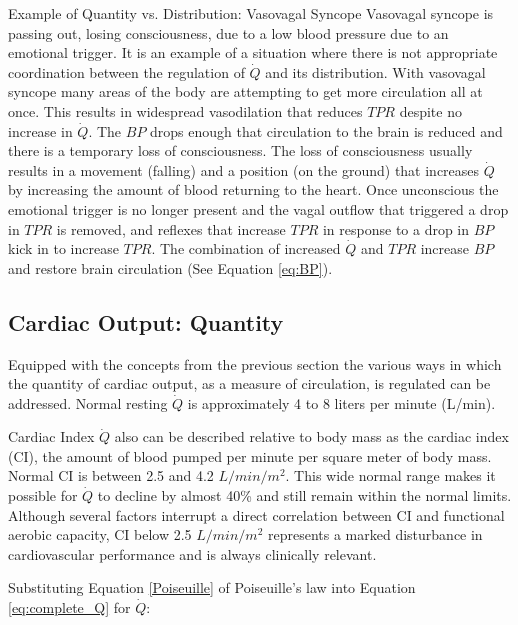 \begin{warning}{Example of Quantity vs. Distribution: Vasovagal Syncope}
   Vasovagal syncope is passing out, losing consciousness, due to a low blood pressure due to an emotional trigger. It is an example of a situation where there is not appropriate coordination between the regulation of $\dot{Q}$ and its distribution. With vasovagal syncope many areas of the body are attempting to get more circulation all at once. This results in widespread vasodilation that reduces $TPR$ despite no increase in $\dot{Q}$. The $BP$ drops enough that circulation to the brain is reduced and there is a temporary loss of consciousness. The loss of consciousness usually results in a movement (falling) and a position (on the ground) that increases $\dot{Q}$ by increasing the amount of blood returning to the heart. Once unconscious the emotional trigger is no longer present and the vagal outflow that triggered a drop in $TPR$ is removed, and reflexes that increase $TPR$ in response to a drop in $BP$ kick in to increase $TPR$. The combination of increased $\dot{Q}$ and $TPR$ increase $BP$ and restore brain circulation (See Equation \ref{eq:BP}). 
\end{warning}

\subsection{Cardiac Output: Quantity}

Equipped with the concepts from the previous section the various ways in which the quantity of cardiac output, as a measure of circulation, is regulated can be addressed. Normal resting $\dot{Q}$ is approximately 4 to 8 liters per minute (L/min). 

\begin{important}{Cardiac Index}
    $\dot{Q}$ also can be described relative to body mass as the cardiac index (CI), the amount of blood pumped per minute per square meter of body mass. Normal CI is between 2.5 and 4.2 $L/min/m^2$. This wide normal range makes it possible for $\dot{Q}$ to decline by almost 40\% and still remain within the normal limits. Although several factors interrupt a direct correlation between CI and functional aerobic capacity,  CI below 2.5 $L/min/m^2$ represents a marked disturbance in cardiovascular performance and is always clinically relevant.
\end{important}

Substituting Equation \ref{Poiseuille} of Poiseuille's law into Equation \ref{eq:complete_Q} for $\dot{Q}$:

